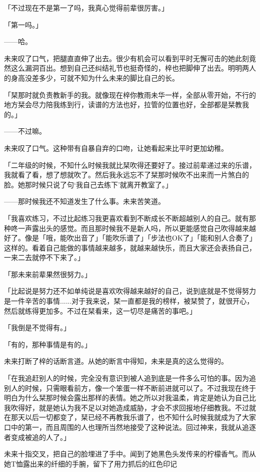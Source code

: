 \documentclass[UTF8]{ctexart}
\begin{document}
    「不过现在不是第一了吗，我真心觉得前辈很厉害。」

    「第一吗。」

    ——哈。

    未来叹了口气，把腿直直伸了出去。很少有机会可以看到平时无懈可击的她此刻竟然这么漏洞百出。想到自己还纠结礼节也挺奇怪的，梓也把脚伸了出去。明明两人的身高没差多少，可就不知为什么未来的脚比自己的长。

    「栞那时就负责教新手的我。就像现在梓你教雨未华一样，全部从零开始，不行的地方栞会尽力陪我练到行，读谱的方法也好，拉管的位置也好，全部都是栞教我的。」

    ——不过嘛。

    未来叹了口气。这种带有自暴自弃的口吻，让她看起来比平时更加幼稚。

    「二年级的时候，不知什么时候我就比栞吹得还要好了。接过前辈递过来的乐谱，我就看了看，想了想就吹了。然后我永远忘不了栞那时候吹不出来而一片煞白的脸。她那时候只说了句‘我自己去练下’就离开教室了。」

    ——那时候我还不知道发生了什么事。未来苦笑道。

    「我喜欢练习，不过比起练习我更喜欢看到不断成长不断超越别人的自己。就有那种咚一声露出头的感觉。而且那时候我不是新人吗，所以更能感觉自己吹得越来越好了。像是「哦，能吹出音了」「能吹乐谱了」「步法也OK了」「能和别人合奏了」这样的。看着自己能做的事情越来越多，就越来越快乐，而且大家还会表扬自己，一来二去就停不下来了。」

    「那未来前辈果然很努力。」

    「比起说是努力还不如单纯说是喜欢吹得越来越好的自己，说到底就是不觉得努力是一件辛苦的事情......对于我来说，栞一直都是我的榜样，被栞赞了，就很开心，然后就练得更加多。不过在栞看来，这一切尽是痛苦的事吧。」

    「我倒是不觉得有。」

    「有的，那种事情是有的。」

    未来打断了梓的话断言道。从她的断言中得知，未来是真的这么觉得的。

    「在我追赶别人的时候，完全没有意识到被人追到底是一件多么可怕的事。因为追别人的时候，只需眼看前方，像一个笨蛋一样不断前进就可以了。不过我现在终于明白为什么栞那时候会露出那样的表情。她之所以对我温柔，肯定是她认为自己比我吹得好，就是她认为我不足以对她造成威胁，才会不求回报地仔细教我。不过就在那天以后一切都变了，栞已经不再教我乐谱了，也不知什么时候我就成为了大家口中的第一，而且周围的人也理所当然地接受了这种说法。回过神来，我就从追逐者变成被追的人了。」

    未来十指交叉，把自己的脸埋进了手中。闻到了她黑色头发传来的柠檬香气。而从她T恤露出来的纤细的手腕，留下了用力抓后的红色印记
\end{document}

